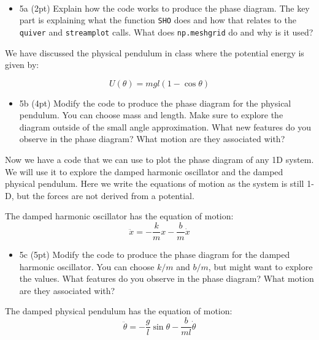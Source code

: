 \documentclass[11pt]{article}
\providecommand{\tightlist}{%
      \setlength{\itemsep}{0pt}\setlength{\parskip}{0pt}}
\begin{document}
    \begin{center}
    \end{center}
    { \hspace*{\fill} \\}
    
    \begin{itemize}
\tightlist
\item
  5a (2pt) Explain how the code works to produce the phase diagram. The
  key part is explaining what the function \texttt{SHO} does and how
  that relates to the \texttt{quiver} and \texttt{streamplot} calls.
  What does \texttt{np.meshgrid} do and why is it used?
\end{itemize}

    We have discussed the physical pendulum in class where the potential
energy is given by:

\[U(\theta)=mgl(1-\cos\theta)\]

\begin{itemize}
\tightlist
\item
  5b (4pt) Modify the code to produce the phase diagram for the physical
  pendulum. You can choose mass and length. Make sure to explore the
  diagram outside of the small angle approximation. What new features do
  you observe in the phase diagram? What motion are they associated
  with?
\end{itemize}

    Now we have a code that we can use to plot the phase diagram of any 1D
system. We will use it to explore the damped harmonic oscillator and the
damped physical pendulum. Here we write the equations of motion as the
system is still 1-D, but the forces are not derived from a potential.

The damped harmonic oscillator has the equation of motion:
\[\ddot{x}=-\frac{k}{m}x-\frac{b}{m}\dot{x}\]

\begin{itemize}
\tightlist
\item
  5c (5pt) Modify the code to produce the phase diagram for the damped
  harmonic oscillator. You can choose \(k/m\) and \(b/m\), but might
  want to explore the values. What features do you observe in the phase
  diagram? What motion are they associated with?
\end{itemize}

    The damped physical pendulum has the equation of motion:
\[\ddot{\theta}=-\frac{g}{l}\sin\theta-\frac{b}{ml}\dot{\theta}\]
\end{document}
